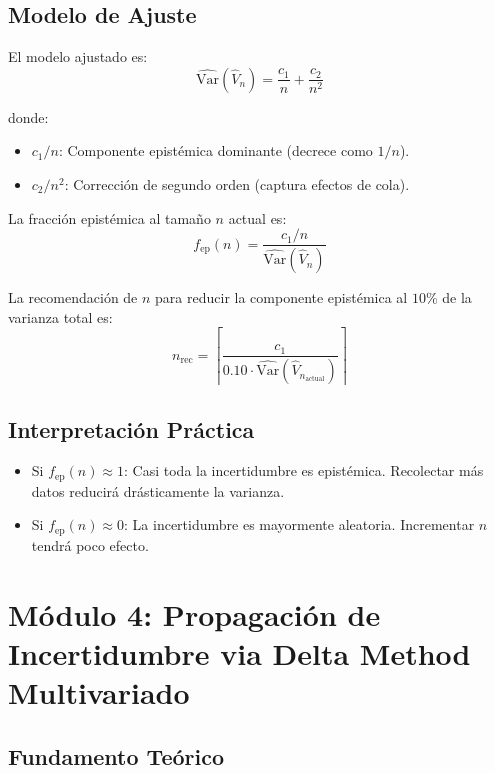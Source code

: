 \documentclass[12pt,a4paper]{article}
\begin{document}
\subsection{Modelo de Ajuste}

El modelo ajustado es:
\[
	\widehat{\text{Var}}(\hat{V}_n) = \frac{c_1}{n} + \frac{c_2}{n^2}
\]

donde:

\begin{itemize}
	\item $c_1/n$: Componente epistémica dominante (decrece como $1/n$).
	\item $c_2/n^2$: Corrección de segundo orden (captura efectos de cola).
\end{itemize}

La fracción epistémica al tamaño $n$ actual es:
\[
	f_{\text{ep}}(n) = \frac{c_1 / n}{\widehat{\text{Var}}(\hat{V}_n)}
\]

La recomendación de $n$ para reducir la componente epistémica al $10\%$ de la varianza total es:
\[
	n_{\text{rec}} = \left\lceil \frac{c_1}{0.10 \cdot \widehat{\text{Var}}(\hat{V}_{n_{\text{actual}}})} \right\rceil
\]

\subsection{Interpretación Práctica}

\begin{itemize}
	\item Si $f_{\text{ep}}(n) \approx 1$: Casi toda la incertidumbre es epistémica. Recolectar más datos reducirá drásticamente la varianza.
	\item Si $f_{\text{ep}}(n) \approx 0$: La incertidumbre es mayormente aleatoria. Incrementar $n$ tendrá poco efecto.
\end{itemize}

\newpage

\section{Módulo 4: Propagación de Incertidumbre via Delta Method Multivariado}

\subsection{Fundamento Teórico}
\end{document}
